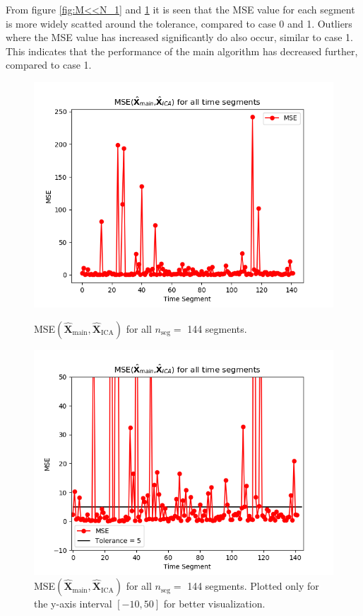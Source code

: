 From figure \ref{fig:M<<N_1} and \ref{fig:M<<N_1_2} it is seen that the MSE value for each segment is more widely scatted around the tolerance, compared to case 0 and 1. 
Outliers where the MSE value has increased significantly do also occur, similar to case 1. 
This indicates that the performance of the main algorithm has decreased further, compared to case 1. 
\begin{figure}[H]
\begin{widepage}
    \begin{minipage}[t]{.45\textwidth}
		\centering
		\includegraphics[width=1\linewidth]{figures/ch_7/resultat/average_mse_second_removed_ica}
	\caption{MSE$\left(\hat{\mathbf{X}}_{\text{main}},\hat{\mathbf{X}}_{\text{ICA}}\right)$ for all $n_{\text{seg}} = $ 144 segments.}
	\label{fig:M<<N_1}
    \end{minipage} 
\hspace{0.5cm}
    \begin{minipage}[t]{.45\textwidth}
        \centering
		\includegraphics[width=1\linewidth]{figures/ch_7/resultat/average_mse_second_removed_ica_zoom.png}
	\caption{MSE$\left(\hat{\mathbf{X}}_{\text{main}},\hat{\mathbf{X}}_{\text{ICA}}\right)$ for all $n_{\text{seg}} = $ 144 segments. Plotted only for the y-axis interval $[-10, 50]$ for better visualization.}
	\label{fig:M<<N_1_2}
    \end{minipage}
\end{widepage}
\end{figure}
